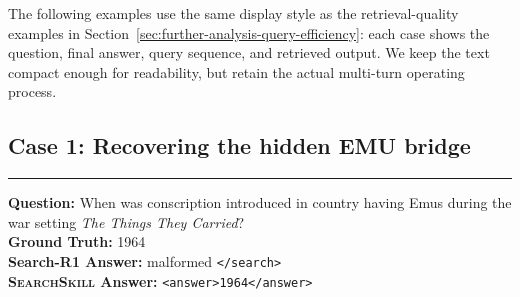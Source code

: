 \documentclass{article}
\newcommand{\Ours}{\textsc{SearchSkill}\xspace}
\begin{document}
The following examples use the same display style as the retrieval-quality examples in Section~\ref{sec:further-analysis-query-efficiency}: each case shows the question, final answer, query sequence, and retrieved output. We keep the text compact enough for readability, but retain the actual multi-turn operating process.

\newcommand{\casehr}{\par\noindent\rule{\linewidth}{0.45pt}\par}
\newcommand{\casedash}{\par\noindent\textcolor{black!45}{\xleaders\hbox{\rule[0.55ex]{6pt}{0.35pt}\hskip 4pt}\hfill}\par}
\newcommand{\tracetok}[3]{\texttt{\textcolor{#1}{<#2>}#3\textcolor{#1}{</#2>}}}
\newcommand{\selecttok}[1]{\tracetok{selecttagcolor}{select\_skill}{#1}}
\newcommand{\skilltok}[1]{\tracetok{skilltagcolor}{skill}{#1}}
\newcommand{\searchtok}[1]{\tracetok{searchtagcolor}{search}{#1}}
\newcommand{\answertok}[1]{\tracetok{answertagcolor}{answer}{#1}}
\newcommand{\closetok}[2]{\texttt{\textcolor{#1}{</#2>}}}

\subsection{Case 1: Recovering the hidden EMU bridge}
\casehr
\small
\noindent\textbf{Question:} When was conscription introduced in country having Emus during the war setting \emph{The Things They Carried}?\\
\textbf{Ground Truth:} 1964\\
\textbf{Search-R1 Answer:} malformed \closetok{searchtagcolor}{search}\\
\textbf{\Ours Answer:} \answertok{1964}
\end{document}

